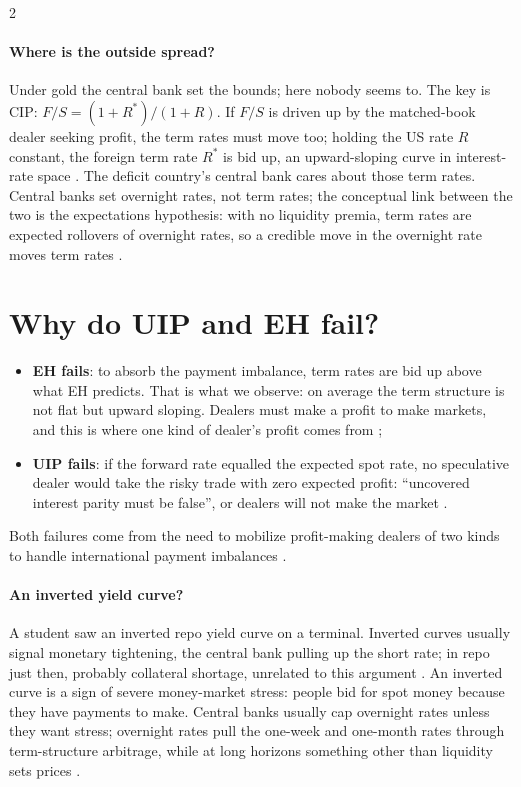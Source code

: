 \begin{paracol}{2}
\paragraph{Where is the outside spread?} Under gold the central bank set the bounds; here nobody seems to. The key is CIP: $F/S=(1+R^\ast)/(1+R)$. If $F/S$ is
driven up by the matched-book dealer seeking profit, the term rates must move too; holding the US rate $R$ constant, the foreign term rate $R^\ast$ is bid up, an
upward-sloping curve in interest-rate space . The deficit country's central bank cares about
those term rates. Central banks set overnight rates, not term rates; the conceptual link between the two is the expectations hypothesis: with no liquidity
premia, term rates are expected rollovers of overnight rates, so a credible move in the overnight rate moves term rates .

\section{Why do UIP and EH fail?}\label{sec:fx-fail}

\begin{intuition}
\begin{itemize}
  \item \textbf{EH fails}: to absorb the payment imbalance, term rates are bid up above what EH predicts. That is what we observe: on average the term structure is
        not flat but upward sloping. Dealers must make a profit to make markets, and this is where one kind of dealer's profit comes from ;
  \item \textbf{UIP fails}: if the forward rate equalled the expected spot rate, no speculative dealer would take the risky trade with zero expected profit:
        ``uncovered interest parity must be false'', or dealers will not make the market .
\end{itemize}
Both failures come from the need to mobilize profit-making dealers of two kinds to handle international payment imbalances .
\end{intuition}

\paragraph{An inverted yield curve?} A student saw an inverted repo yield curve on a terminal. Inverted curves usually signal monetary tightening, the central
bank pulling up the short rate; in repo just then, probably collateral shortage, unrelated to this argument .
An inverted curve is a sign of severe money-market stress: people bid for spot money because they have payments to make. Central banks usually cap overnight rates
unless they want stress; overnight rates pull the one-week and one-month rates through term-structure arbitrage, while at long horizons something other than
liquidity sets prices .


\end{paracol}
